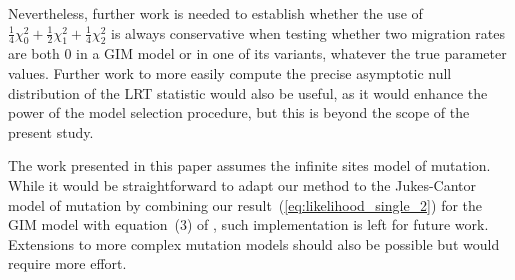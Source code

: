 \documentclass[11pt]{article}
\begin{document}
Nevertheless, further work is needed to establish whether the use of $\frac{1}{4} \chi^2_0 +\frac{1}{2} \chi^2_1 +\frac{1}{4} \chi^2_2$ is always conservative when testing whether two migration rates are both 0 in a GIM model or in one of its variants, whatever the true parameter values.
Further work to more easily compute the precise asymptotic null distribution of the LRT statistic would also be useful, as it would enhance the power of the model selection procedure, but this is beyond the scope of the present study.

The work presented in this paper assumes the infinite sites model of mutation. While it would be straightforward to adapt our method to the Jukes-Cantor model of mutation \citep{Jukes1969} by combining our result~(\ref{eq:likelihood_single_2}) for the GIM model with equation~(3) of \citet{Lohse2011}, 
such implementation is left for future work. 
Extensions to more complex mutation models should also be possible but would require more effort.
\end{document}
